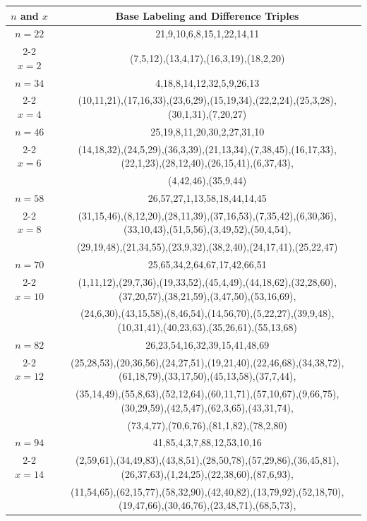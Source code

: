 \begin{tabular}{| c | c |}
\hline
\(n\) and \(x\) & Base Labeling and Difference Triples\\
\hline
\(n=22\) & 
21,9,10,6,8,15,1,22,14,11\\
\cline{2-2}
\(x=2\)
&(7,5,12),(13,4,17),(16,3,19),(18,2,20)\\
\hline 
\(n=34\) & 
4,18,8,14,12,32,5,9,26,13\\
\cline{2-2}
\(x=4\)
&(10,11,21),(17,16,33),(23,6,29),(15,19,34),(22,2,24),(25,3,28),(30,1,31),(7,20,27)\\
\hline 
\(n=46\) & 
25,19,8,11,20,30,2,27,31,10\\
\cline{2-2}
\(x=6\)
&(14,18,32),(24,5,29),(36,3,39),(21,13,34),(7,38,45),(16,17,33),(22,1,23),(28,12,40),(26,15,41),(6,37,43),\\
&(4,42,46),(35,9,44)\\
\hline 
\(n=58\) & 
26,57,27,1,13,58,18,44,14,45\\
\cline{2-2}
\(x=8\)
&(31,15,46),(8,12,20),(28,11,39),(37,16,53),(7,35,42),(6,30,36),(33,10,43),(51,5,56),(3,49,52),(50,4,54),\\
&(29,19,48),(21,34,55),(23,9,32),(38,2,40),(24,17,41),(25,22,47)\\
\hline 
\(n=70\) & 
25,65,34,2,64,67,17,42,66,51\\
\cline{2-2}
\(x=10\)
&(1,11,12),(29,7,36),(19,33,52),(45,4,49),(44,18,62),(32,28,60),(37,20,57),(38,21,59),(3,47,50),(53,16,69),\\
&(24,6,30),(43,15,58),(8,46,54),(14,56,70),(5,22,27),(39,9,48),(10,31,41),(40,23,63),(35,26,61),(55,13,68)\\
\hline 
\(n=82\) & 
26,23,54,16,32,39,15,41,48,69\\
\cline{2-2}
\(x=12\)
&(25,28,53),(20,36,56),(24,27,51),(19,21,40),(22,46,68),(34,38,72),(61,18,79),(33,17,50),(45,13,58),(37,7,44),\\
&(35,14,49),(55,8,63),(52,12,64),(60,11,71),(57,10,67),(9,66,75),(30,29,59),(42,5,47),(62,3,65),(43,31,74),\\
&(73,4,77),(70,6,76),(81,1,82),(78,2,80)\\
\hline 
\(n=94\) & 
41,85,4,3,7,88,12,53,10,16\\
\cline{2-2}
\(x=14\)
&(2,59,61),(34,49,83),(43,8,51),(28,50,78),(57,29,86),(36,45,81),(26,37,63),(1,24,25),(22,38,60),(87,6,93),\\
&(11,54,65),(62,15,77),(58,32,90),(42,40,82),(13,79,92),(52,18,70),(19,47,66),(30,46,76),(23,48,71),(68,5,73),\\

\end{tabular}

